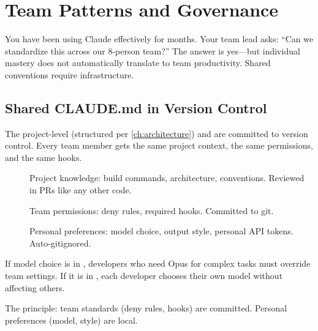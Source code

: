 \chapter{Team Patterns and Governance}
\label{ch:team}

\begin{itshape}
You have been using Claude effectively for months.
Your team lead asks: ``Can we standardize this across our 8-person team?''
The answer is yes---but individual mastery does not automatically
translate to team productivity. Shared conventions require infrastructure.
\end{itshape}

\section{Shared CLAUDE.md in Version Control}
\label{sec:shared-claude-md}


The project-level  (structured per \cref{ch:architecture})
and  are committed to version control.
Every team member gets the same project context, the same permissions,
and the same hooks.


\begin{description}
  \item[] Project knowledge: build commands, architecture, conventions.
    Reviewed in PRs like any other code.
  \item[] Team permissions: deny rules, required hooks.
    Committed to git.
  \item[] Personal preferences: model choice,
    output style, personal API tokens. Auto-gitignored.
\end{description}

\begin{whybox}
If model choice is in , developers who need Opus
for complex tasks must override team settings.
If it is in , each developer chooses their own
model without affecting others.

The principle: team standards (deny rules, hooks) are committed.
Personal preferences (model, style) are local.
\end{whybox}

